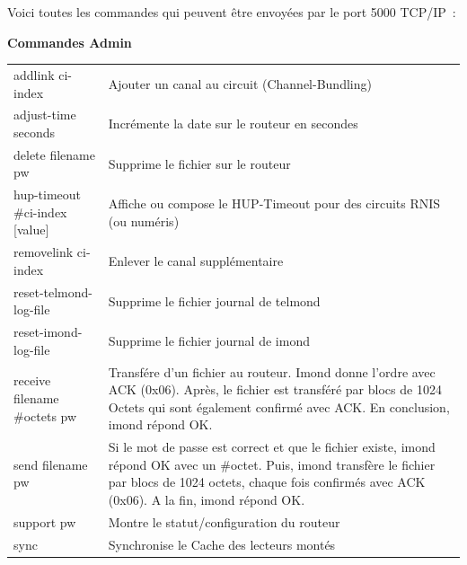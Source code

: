  Voici toutes les commandes qui peuvent être envoyées par le port 5000 TCP/IP~:
  \begin{table}
    \textbf{Commandes Admin}

    \vspace{1ex}
    \begin{tabular}{lp{9cm}}

      addlink ci-index              & Ajouter un canal au circuit (Channel-Bundling) \\
      adjust-time seconds           & Incrémente la date sur le routeur en secondes \\
      delete filename pw            & Supprime le fichier sur le routeur \\
      hup-timeout \#ci-index [value]& Affiche ou compose le HUP-Timeout pour
                                      des circuits RNIS (ou numéris) \\
      removelink ci-index           & Enlever le canal supplémentaire \\
      reset-telmond-log-file        & Supprime le fichier journal de telmond \\
      reset-imond-log-file          & Supprime le fichier journal de imond \\
      receive filename \#octets pw  & Transfére d'un fichier au routeur.
                                      Imond donne l'ordre avec ACK (0x06). Après,
                                      le fichier est transféré par blocs de 1024
                                      Octets qui sont également confirmé avec ACK.
                                      En conclusion, imond répond OK. \\
      send filename pw              & Si le mot de passe est correct et que le
                                      fichier existe, imond répond OK avec un \#octet.
                                      Puis, imond transfère le fichier par blocs de
                                      1024 octets, chaque fois confirmés avec ACK
                                      (0x06). A la fin, imond répond OK. \\
      support pw                    & Montre le statut/configuration du routeur \\
      sync                          & Synchronise le Cache des lecteurs montés \\
    \end{tabular}
  \end{table}


